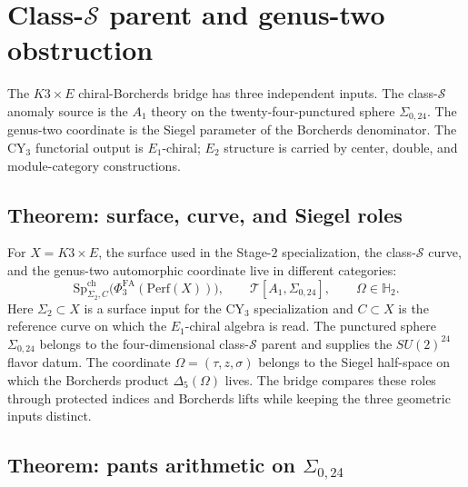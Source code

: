 \providecommand{\kBKM}{\kappa_{\mathrm{BKM}}}
\providecommand{\kch}{\kappa_{\mathrm{ch}}}
\providecommand{\kcat}{\kappa_{\mathrm{cat}}}
\providecommand{\kfib}{\kappa_{\mathrm{fiber}}}
\providecommand{\CoHA}{\mathrm{CoHA}}
\providecommand{\Perf}{\mathrm{Perf}}
\providecommand{\Rep}{\mathrm{Rep}}
\providecommand{\SpCh}{\mathrm{Sp}^{\mathrm{ch}}}
\providecommand{\PhiFA}{\Phi^{\mathrm{FA}}}
\providecommand{\cT}{\mathcal{T}}
\providecommand{\cW}{\mathcal{W}}
\providecommand{\cO}{\mathcal{O}}
\providecommand{\CC}{\mathbb{C}}
\providecommand{\ZZ}{\mathbb{Z}}

\section{Class-$\mathcal S$ parent and genus-two obstruction}
\label{sec:k3e-class-s-parent}

The $K3\times E$ chiral-Borcherds bridge has three independent inputs.
The class-$\mathcal S$ anomaly source is the $A_1$ theory on the
twenty-four-punctured sphere $\Sigma_{0,24}$.  The genus-two coordinate
is the Siegel parameter of the Borcherds denominator.  The CY$_3$
functorial output is $E_1$-chiral; $E_2$ structure is carried by center,
double, and module-category constructions.

\subsection{Theorem: surface, curve, and Siegel roles}
\label{subsec:k3e-three-role-separation}

For $X=K3\times E$, the surface used in the Stage-$2$ specialization,
the class-$\mathcal S$ curve, and the genus-two automorphic coordinate
live in different categories:
\[
  \SpCh_{\Sigma_2,C}\bigl(\PhiFA_3(\Perf(X))\bigr),\qquad
  \cT[A_1,\Sigma_{0,24}],\qquad
  \Omega\in\mathbb H_2.
\]
Here $\Sigma_2\subset X$ is a surface input for the CY$_3$
specialization and $C\subset X$ is the reference curve on which the
$E_1$-chiral algebra is read.  The punctured sphere $\Sigma_{0,24}$
belongs to the four-dimensional class-$\mathcal S$ parent and supplies
the $SU(2)^{24}$ flavor datum.  The coordinate
$\Omega=(\tau,z,\sigma)$ belongs to the Siegel half-space on which the
Borcherds product $\Delta_5(\Omega)$ lives.  The bridge compares these
roles through protected indices and Borcherds lifts while keeping the
three geometric inputs distinct.

\subsection{Theorem: pants arithmetic on $\Sigma_{0,24}$}
\label{subsec:sigma-0-24-pants-arithmetic}

